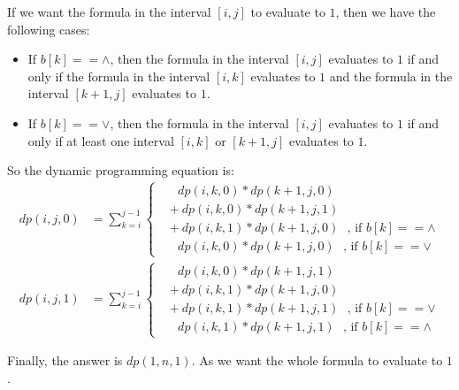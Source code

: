 If we want the formula in the interval $[i,j]$ to evaluate to $1$, then we have the following cases:
\begin{itemize}
    \item If $b[k] == \land$, then the formula in the interval $[i,j]$ evaluates to $1$ if and only if the formula in the interval $[i,k]$ evaluates to $1$ and the formula in the interval $[k+1,j]$ evaluates to $1$.
    \item If $b[k] == \lor$, then the formula in the interval $[i,j]$ evaluates to $1$ if and only if at least one interval $[i,k]$ or $[k+1,j]$ evaluates to $1$.
\end{itemize}

So the dynamic programming equation is:
\begin{equation}
    \begin{aligned}
        dp(i,j,0) &= \sum_{k=i}^{j-1} \left\{
            \begin{array}{ll}
                &\ \ \ dp(i,k,0) * dp(k+1,j,0) \\
                &+\ dp(i,k,0) * dp(k+1,j,1) \\
                &+\ dp(i,k,1) * dp(k+1,j,0) \ \ \ \text{, if } b[k] == \land\\
                &\ \ \ dp(i,k,0) * dp(k+1,j,0) \ \ \ \text{, if } b[k] == \lor
            \end{array}
        \right.\\
        dp(i,j,1) &= \sum_{k=i}^{j-1} \left\{
            \begin{array}{ll}
                &\ \ \ dp(i,k,0) * dp(k+1,j,1) \\
                &+\ dp(i,k,1) * dp(k+1,j,0) \\
                &+\ dp(i,k,1) * dp(k+1,j,1) \ \ \ \text{, if } b[k] == \lor\\
                &\ \ \ dp(i,k,1) * dp(k+1,j,1) \ \ \ \text{, if } b[k] == \land
            \end{array}
        \right.
    \end{aligned}
\end{equation}
    
    Finally, the answer is $dp(1,n,1)$. As we want the whole formula to evaluate to $1$.\\



